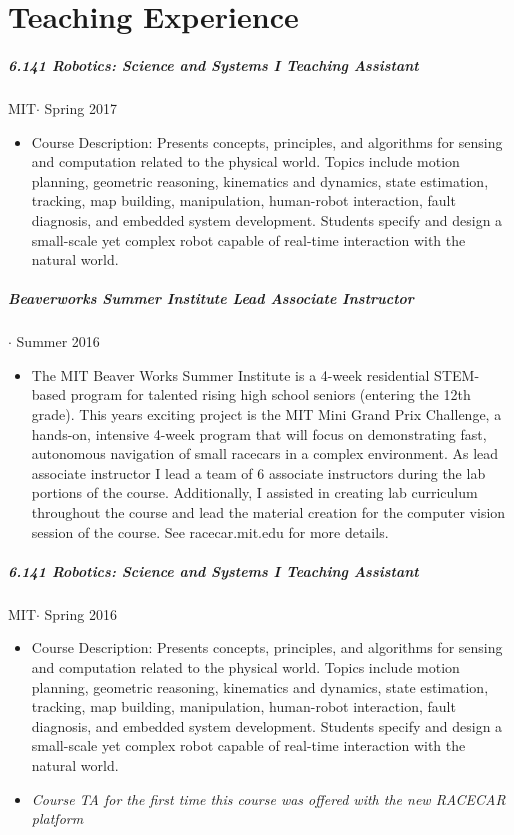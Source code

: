 \documentclass[10pt,letterpaper]{article}
\begin{document}
\section*{Teaching Experience}
\subparagraph{6.141 Robotics: Science and Systems I Teaching Assistant}
MIT$\cdot$ Spring 2017
\begin{itemize}
\item Course Description: Presents concepts, principles, and algorithms for sensing and computation related to the physical world. Topics include motion planning, geometric reasoning, kinematics and dynamics, state estimation, tracking, map building, manipulation, human-robot interaction, fault diagnosis, and embedded system development. Students specify and design a small-scale yet complex robot capable of real-time interaction with the natural world. 
\end{itemize}
\subparagraph{Beaverworks Summer Institute Lead Associate Instructor}
 $\cdot$ Summer 2016
\begin{itemize}
\item The MIT Beaver Works Summer Institute is a 4-week residential STEM-based program for talented rising high school seniors (entering the 12th grade). This years exciting project is the MIT Mini Grand Prix Challenge, a hands-on, intensive 4-week program that will focus on demonstrating fast, autonomous navigation of small racecars in a complex environment. As lead associate instructor I lead a team of 6 associate instructors during the lab portions of the course.  Additionally, I assisted in creating lab curriculum throughout the course and lead the material creation for the computer vision session of the course. See racecar.mit.edu for more details.
\end{itemize}
\subparagraph{6.141 Robotics: Science and Systems I Teaching Assistant}
MIT$\cdot$ Spring 2016
\begin{itemize}
\item Course Description: Presents concepts, principles, and algorithms for sensing and computation related to the physical world. Topics include motion planning, geometric reasoning, kinematics and dynamics, state estimation, tracking, map building, manipulation, human-robot interaction, fault diagnosis, and embedded system development. Students specify and design a small-scale yet complex robot capable of real-time interaction with the natural world. 
\item {\em Course TA for the first time this course was offered with the new RACECAR platform}
\end{itemize}
\end{document}
